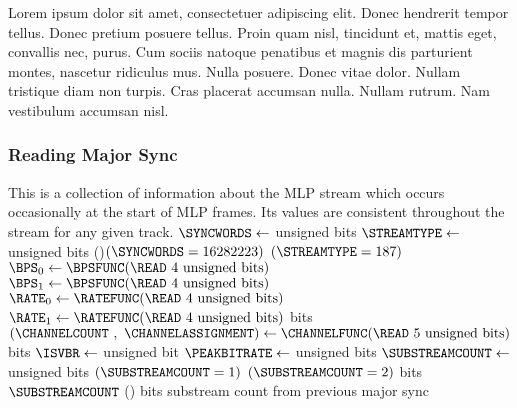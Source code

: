 \clearpage

Lorem ipsum dolor sit amet, consectetuer adipiscing elit. Donec hendrerit tempor tellus. Donec pretium posuere tellus. Proin quam nisl, tincidunt et, mattis eget, convallis nec, purus. Cum sociis natoque penatibus et magnis dis parturient montes, nascetur ridiculus mus. Nulla posuere. Donec vitae dolor. Nullam tristique diam non turpis. Cras placerat accumsan nulla. Nullam rutrum. Nam vestibulum accumsan nisl.



\clearpage

\subsubsection{Reading Major Sync}
This is a collection of information about the MLP stream
which occurs occasionally at the start of MLP frames.
Its values are consistent throughout the stream for any given track.
{
$\SYNCWORDS \leftarrow$  unsigned bits\;
$\STREAMTYPE \leftarrow$  unsigned bits\;
\eIf(){$(\SYNCWORDS = 16282223)$ \AND $(\STREAMTYPE = 187)$}{
  $\text{\BPS}_0 \leftarrow \BPSFUNC(\text{\READ 4 unsigned bits})$\;
  $\text{\BPS}_1 \leftarrow \BPSFUNC(\text{\READ 4 unsigned bits})$\;
  $\text{\RATE}_0 \leftarrow \RATEFUNC(\text{\READ 4 unsigned bits})$\;
  $\text{\RATE}_1 \leftarrow \RATEFUNC(\text{\READ 4 unsigned bits})$\;
   bits\;
  $(\text{\CHANNELCOUNT}~,~\text{\CHANNELASSIGNMENT}) \leftarrow \CHANNELFUNC(\text{\READ 5 unsigned bits})$\;
   bits\;
  $\text{\ISVBR} \leftarrow$  unsigned bit\;
  $\text{\PEAKBITRATE} \leftarrow$  unsigned bits\;
  $\text{\SUBSTREAMCOUNT} \leftarrow$  unsigned bits\;
  \ASSERT $(\text{\SUBSTREAMCOUNT} = 1)$ \OR $(\text{\SUBSTREAMCOUNT} = 2)$\;
   bits\;
  \Return $\text{\SUBSTREAMCOUNT}$\;
}(){
   bits\;
  \Return substream count from previous major sync\;
}
\EALGORITHM
}
